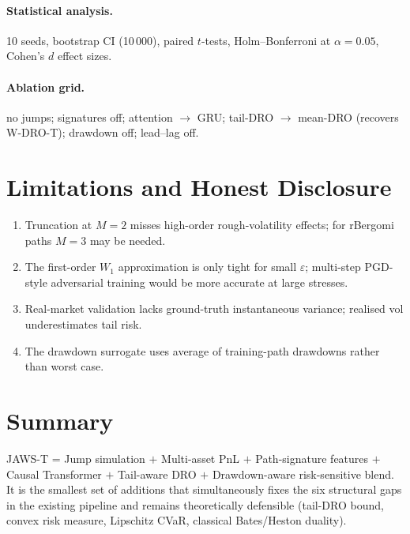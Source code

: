 \documentclass[11pt,a4paper]{article}
\begin{document}
\paragraph{Statistical analysis.} 10 seeds, bootstrap CI (10\,000), paired
$t$-tests, Holm--Bonferroni at $\alpha=0.05$, Cohen's $d$ effect sizes.

\paragraph{Ablation grid.} no jumps; signatures off; attention $\to$ GRU;
tail-DRO $\to$ mean-DRO (recovers W-DRO-T); drawdown off; lead--lag off.

\section{Limitations and Honest Disclosure}

\begin{enumerate}[leftmargin=*]
  \item Truncation at $M=2$ misses high-order rough-volatility effects; for
    rBergomi paths $M=3$ may be needed.
  \item The first-order $W_1$ approximation is only tight for small
    $\varepsilon$; multi-step PGD-style adversarial training would be more
    accurate at large stresses.
  \item Real-market validation lacks ground-truth instantaneous variance;
    realised vol underestimates tail risk.
  \item The drawdown surrogate uses average of training-path drawdowns rather
    than worst case.
\end{enumerate}

\section{Summary}

JAWS-T = Jump simulation $+$ Multi-asset PnL $+$ Path-signature features
$+$ Causal Transformer $+$ Tail-aware DRO $+$ Drawdown-aware risk-sensitive
blend. It is the smallest set of additions that simultaneously fixes the
six structural gaps in the existing pipeline and remains theoretically
defensible (tail-DRO bound, convex risk measure, Lipschitz CVaR, classical
Bates/Heston duality).
\end{document}
